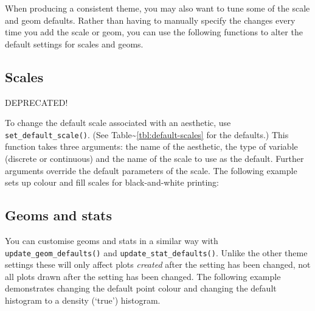 When producing a consistent theme, you may also want to tune some of the
scale and geom defaults. Rather than having to manually specify the
changes every time you add the scale or geom, you can use the following
functions to alter the default settings for scales and geoms.

\subsection{Scales}\label{sub:customise-scales}

DEPRECATED!

To change the default scale associated with an aesthetic, use
\texttt{set\_default\_scale()}. (See
Table\textasciitilde{}\ref{tbl:default-scales} for the defaults.) This
function takes three arguments: the name of the aesthetic, the type of
variable (discrete or continuous) and the name of the scale to use as
the default. Further arguments override the default parameters of the
scale. The following example sets up colour and fill scales for
black-and-white printing: 

\subsection{Geoms and stats}\label{sub:geoms-and-stats}

You can customise geoms and stats in a similar way with
\texttt{update\_geom\_defaults()} and \texttt{update\_stat\_defaults()}.
Unlike the other theme settings these will only affect plots
\emph{created} after the setting has been changed, not all plots drawn
after the setting has been changed. The following example demonstrates
changing the default point colour and changing the default histogram to
a density (`true') histogram. 
 

\begin{Shaded}
\begin{Highlighting}[]
\NormalTok{(}\NormalTok{, }\NormalTok{(} \NormalTok{))}
 
\NormalTok{(}\NormalTok{, }\NormalTok{(} 
  \NormalTok{, } \NormalTok{)}
\end{Highlighting}
\end{Shaded}

